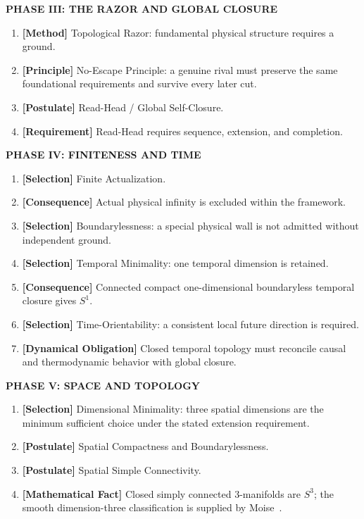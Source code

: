 \documentclass[11pt]{article}
\theoremstyle{canonstyle}
\providecommand{\Sone}{S^1}
\providecommand{\Sthree}{S^3}
\begin{document}
\textbf{PHASE III: THE RAZOR AND GLOBAL CLOSURE}
\begin{enumerate}[resume]
    \item \textbf{[Method]} Topological Razor: fundamental physical structure requires a ground.
    \item \textbf{[Principle]} No-Escape Principle: a genuine rival must preserve the same foundational requirements and survive every later cut.
    \item \textbf{[Postulate]} Read-Head / Global Self-Closure.
    \item \textbf{[Requirement]} Read-Head requires sequence, extension, and completion.
\end{enumerate}

\textbf{PHASE IV: FINITENESS AND TIME}
\begin{enumerate}[resume]
    \item \textbf{[Selection]} Finite Actualization.
    \item \textbf{[Consequence]} Actual physical infinity is excluded within the framework.
    \item \textbf{[Selection]} Boundarylessness: a special physical wall is not admitted without independent ground.
    \item \textbf{[Selection]} Temporal Minimality: one temporal dimension is retained.
    \item \textbf{[Consequence]} Connected compact one-dimensional boundaryless temporal closure gives $\Sone$.
    \item \textbf{[Selection]} Time-Orientability: a consistent local future direction is required.
    \item \textbf{[Dynamical Obligation]} Closed temporal topology must reconcile causal and thermodynamic behavior with global closure.
\end{enumerate}

\textbf{PHASE V: SPACE AND TOPOLOGY}
\begin{enumerate}[resume]
    \item \textbf{[Selection]} Dimensional Minimality: three spatial dimensions are the minimum sufficient choice under the stated extension requirement.
    \item \textbf{[Postulate]} Spatial Compactness and Boundarylessness.
    \item \textbf{[Postulate]} Spatial Simple Connectivity.
    \item \textbf{[Mathematical Fact]} Closed simply connected 3-manifolds are $\Sthree$; the smooth dimension-three classification is supplied by Moise~\cite{Perelman,Moise}.
\end{enumerate}
\end{document}
